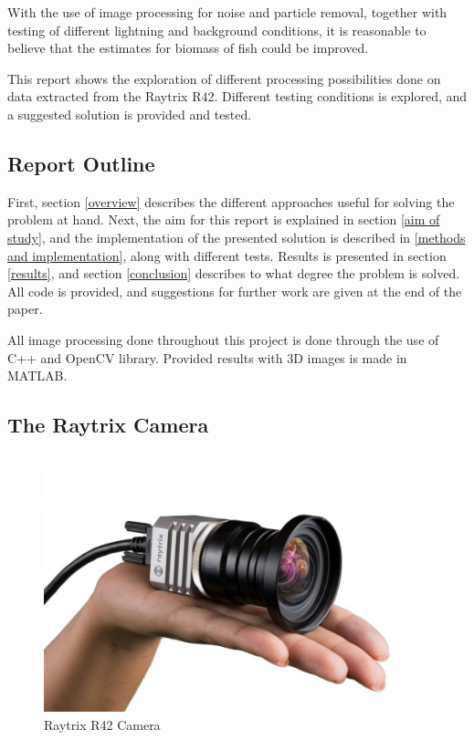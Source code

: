 With the use of image processing for noise and particle removal, together with testing of different lightning and background conditions, it is reasonable to believe that the estimates for biomass of fish could be improved.

This report shows the exploration of different processing possibilities done on data extracted from the Raytrix R42. Different testing conditions is explored, and a suggested solution is provided and tested.




\subsection{Report Outline} \label{report_outline}

First, section \ref{overview} describes the different approaches useful for solving the problem at hand. Next, the aim for this report is explained in section \ref{aim of study}, and the implementation of the presented solution is described in \ref{methods and implementation}, along with different tests. Results is presented in section \ref{results}, and section \ref{conclusion} describes to what degree the problem is solved. All code is provided, and suggestions for further work are given at the end of the paper.

All image processing done throughout this project is done through the use of C++ and OpenCV library. Provided results with 3D images is made in MATLAB.



\subsection{The Raytrix Camera}\label{the_raytrix_camera}

\begin{figure}[ht]
    \centering
    \includegraphics[width=.9\linewidth]{images/introduction/raytrix_camera}
    \caption{Raytrix R42 Camera}
    \label{fig:raytrix_camera}
\end{figure}

